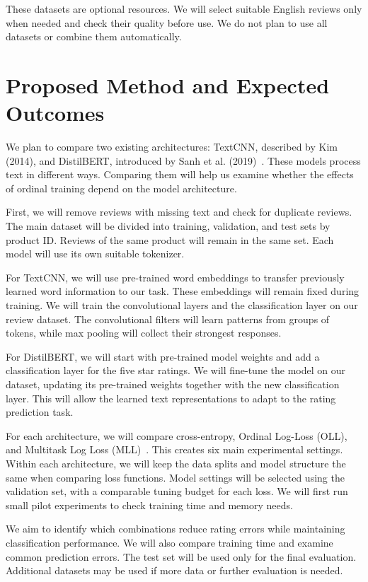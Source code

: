 \documentclass[conference,a4paper,9pt]{IEEEtran}
\begin{document}
These datasets are optional resources. We will select suitable English reviews only when needed and check their quality before use. We do not plan to use all datasets or combine them automatically.

\section{Proposed Method and Expected Outcomes}

We plan to compare two existing architectures: TextCNN, described by Kim (2014), and DistilBERT, introduced by Sanh et al. (2019)~\cite{kim2014,sanh2019}. These models process text in different ways. Comparing them will help us examine whether the effects of ordinal training depend on the model architecture.

First, we will remove reviews with missing text and check for duplicate reviews. The main dataset will be divided into training, validation, and test sets by product ID. Reviews of the same product will remain in the same set. Each model will use its own suitable tokenizer.

For TextCNN, we will use pre-trained word embeddings to transfer previously learned word information to our task. These embeddings will remain fixed during training. We will train the convolutional layers and the classification layer on our review dataset. The convolutional filters will learn patterns from groups of tokens, while max pooling will collect their strongest responses.

For DistilBERT, we will start with pre-trained model weights and add a classification layer for the five star ratings. We will fine-tune the model on our dataset, updating its pre-trained weights together with the new classification layer. This will allow the learned text representations to adapt to the rating prediction task.

For each architecture, we will compare cross-entropy, Ordinal Log-Loss (OLL), and Multitask Log Loss (MLL)~\cite{castagnos2022,kasa2024}. This creates six main experimental settings. Within each architecture, we will keep the data splits and model structure the same when comparing loss functions. Model settings will be selected using the validation set, with a comparable tuning budget for each loss. We will first run small pilot experiments to check training time and memory needs.

We aim to identify which combinations reduce rating errors while maintaining classification performance. We will also compare training time and examine common prediction errors. The test set will be used only for the final evaluation. Additional datasets may be used if more data or further evaluation is needed.
\end{document}
